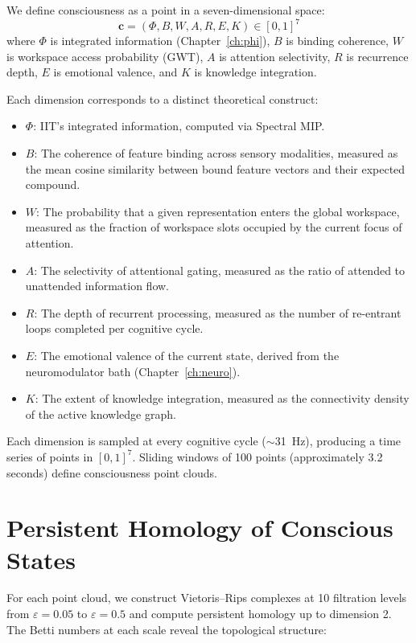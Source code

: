 \documentclass[12pt]{book}
\begin{document}
We define consciousness as a point in a seven-dimensional space:
\begin{equation}\label{eq:consciousness-space}
\mathbf{c} = (\Phi, B, W, A, R, E, K) \in [0,1]^7
\end{equation}
where $\Phi$ is integrated information (Chapter~\ref{ch:phi}), $B$ is binding coherence, $W$ is workspace access probability (GWT), $A$ is attention selectivity, $R$ is recurrence depth, $E$ is emotional valence, and $K$ is knowledge integration.

Each dimension corresponds to a distinct theoretical construct:
\begin{itemize}
  \item $\Phi$: IIT's integrated information, computed via Spectral MIP.
  \item $B$: The coherence of feature binding across sensory modalities, measured as the mean cosine similarity between bound feature vectors and their expected compound.
  \item $W$: The probability that a given representation enters the global workspace, measured as the fraction of workspace slots occupied by the current focus of attention.
  \item $A$: The selectivity of attentional gating, measured as the ratio of attended to unattended information flow.
  \item $R$: The depth of recurrent processing, measured as the number of re-entrant loops completed per cognitive cycle.
  \item $E$: The emotional valence of the current state, derived from the neuromodulator bath (Chapter~\ref{ch:neuro}).
  \item $K$: The extent of knowledge integration, measured as the connectivity density of the active knowledge graph.
\end{itemize}

Each dimension is sampled at every cognitive cycle ($\sim$31~Hz), producing a time series of points in $[0,1]^7$. Sliding windows of 100 points (approximately 3.2 seconds) define consciousness point clouds.

\section{Persistent Homology of Conscious States}

For each point cloud, we construct Vietoris--Rips complexes at 10 filtration levels from $\varepsilon = 0.05$ to $\varepsilon = 0.5$ and compute persistent homology up to dimension 2. The Betti numbers at each scale reveal the topological structure:
\end{document}
